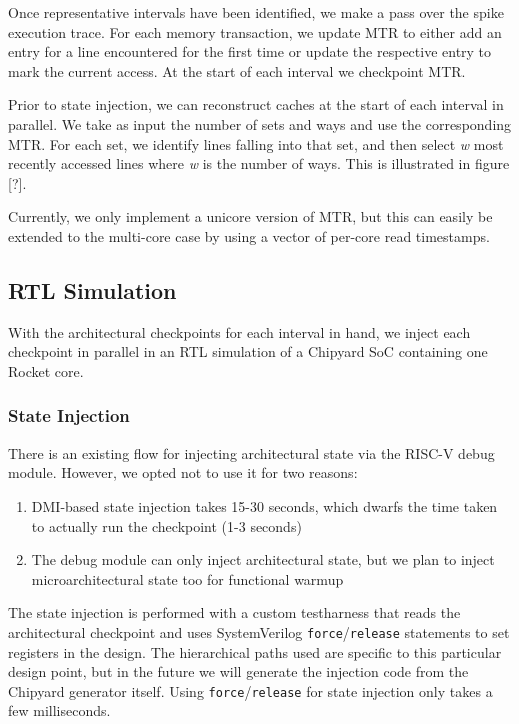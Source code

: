 \documentclass[sigplan,nonacm,10pt]{acmart}
\begin{document}
Once representative intervals have been identified, we make a pass over the spike execution trace. For each memory transaction, we update MTR to either add an entry for a line encountered for the first time or update the respective entry to mark the current access. At the start of each interval we checkpoint MTR. 

Prior to state injection, we can reconstruct caches at the start of each interval in parallel. We take as input the number of sets and ways and use the corresponding MTR. For each set, we identify lines falling into that set, and then select \textit{w} most recently accessed lines where \textit{w} is the number of ways. This is illustrated in figure [?].

Currently, we only implement a unicore version of MTR, but this can easily be extended to the multi-core case by using a vector of per-core read timestamps.

\subsection{RTL Simulation}

With the architectural checkpoints for each interval in hand, we inject each checkpoint in parallel in an RTL simulation of a Chipyard SoC containing one Rocket core.

\subsubsection{State Injection}

There is an existing flow for injecting architectural state via the RISC-V debug module.
However, we opted not to use it for two reasons:
\begin{enumerate}
  \item DMI-based state injection takes 15-30 seconds, which dwarfs the time taken to actually run the checkpoint (1-3 seconds)
  \item The debug module can only inject architectural state, but we plan to inject microarchitectural state too for functional warmup
\end{enumerate}

The state injection is performed with a custom testharness that reads the architectural checkpoint and uses SystemVerilog \texttt{force}/\texttt{release} statements to set registers in the design.
The hierarchical paths used are specific to this particular design point, but in the future we will generate the injection code from the Chipyard generator itself.
Using \texttt{force}/\texttt{release} for state injection only takes a few milliseconds.
\end{document}
